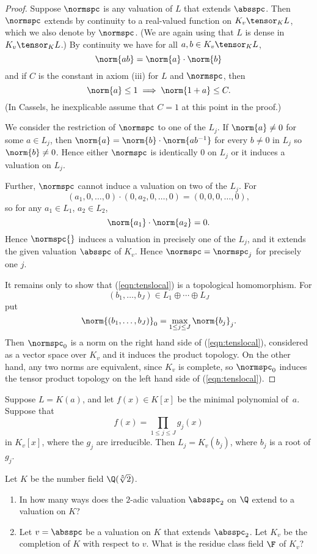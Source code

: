 \documentclass[11pt]{book}
\begin{document}
\begin{ch}
\begin{proof}
Suppose $\normspc$ is any valuation of $L$ that extends $\absspc$.  Then
$\normspc$ extends by continuity to a real-valued function on $K_v\tensor_K L$,
which we also denote by $\normspc$. (We are again using that $L$ is dense
in $K_v\tensor_K L$.)  By continuity we have for all $a,b\in K_v\tensor_K L$,
$$
  \norm{ab} = \norm{a}\cdot \norm{b}
$$
and if $C$ is the constant in axiom (iii) for $L$ and $\normspc$, then
$$
 \norm{a}\leq 1 \implies \norm{1+a}\leq C.
$$
(In Cassels, he inexplicable assume that $C=1$ at this point in the proof.)

We consider the restriction of $\normspc$ to one of the $L_j$.  If $\norm{a}\neq 0$
for some $a\in L_j$, then $\norm{a} = \norm{b}\cdot \norm{ab^{-1}}$ for every
$b\neq 0$ in $L_j$ so $\norm{b} \neq 0$.  Hence either $\normspc$ is identically
$0$ on $L_j$ or it induces a valuation on $L_j$.

Further, $\normspc$ cannot induce a valuation on two of the $L_j$.  For
$$
  (a_1,0,\ldots, 0)\cdot (0,a_2,0,\ldots,0) = (0,0,0,\ldots,0),
$$
so for any $a_1\in L_1$, $a_2\in L_2$,
$$
  \norm{a_1}\cdot \norm{a_2} = 0.
$$
Hence $\normspc{}$ induces a valuation in precisely one of the $L_j$,
and it extends the given valuation $\absspc$ of $K_v$.  Hence $\normspc = \normspc_j$
for precisely one $j$.

It remains only to show that (\ref{eqn:tenslocal}) is a topological homomorphism.
For $$(b_1,\ldots, b_J)\in L_1\oplus \cdots \oplus L_J$$ put
$$
\norm{(b_1,\ldots, b_J)}_0 = \max_{1\leq j \leq J} \norm{b_j}_j.
$$
Then $\normspc_0$ is a norm on the right hand side of (\ref{eqn:tenslocal}),
considered as a vector space over $K_v$ and it induces the product topology.
On the other hand, any two norms are equivalent, since $K_v$ is complete,
so $\normspc_0$ induces the tensor product topology on the left hand side of
(\ref{eqn:tenslocal}).
\end{proof}

\begin{corollary}
Suppose $L=K(a)$, and let $f(x)\in K[x]$ be the minimal polynomial of~$a$.
Suppose that
$$
f(x) = \prod_{1\leq j\leq J} g_j(x)
$$
in $K_v[x]$, where the $g_j$ are irreducible.  Then $L_j = K_v(b_j)$, where
$b_j$ is a root of $g_j$.
\end{corollary}

\begin{exercise}\label{ex:extval1}
Let $K$ be the number field $\Q(\sqrt[5]{2})$.
\begin{enumerate}
\item In how many ways does the $2$-adic valuation $\absspc_2$ on $\Q$
extend to a valuation on $K$?
\item Let $v=\absspc$ be a valuation on $K$ that extends $\absspc_2$.
Let $K_v$ be the completion of $K$ with respect to $v$.
What is the residue class field $\F$ of $K_v$?
\end{enumerate}
\end{exercise}


\end{ch}
\end{document}
